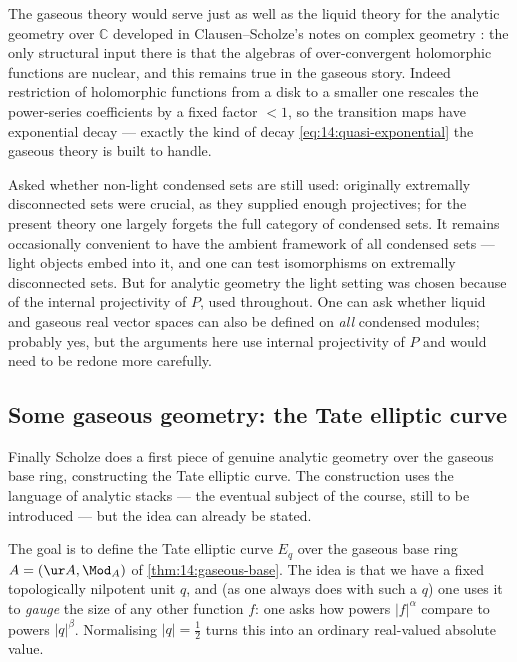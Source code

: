 \begin{remark}
\label{rmk:14:complex-geometry}
The gaseous theory would serve just as well as the liquid theory for the analytic
geometry over $\mathbb{C}$ developed in Clausen--Scholze's notes on complex geometry
\cite{clausen2020analytic}: the only structural input there is that the algebras of
over-convergent holomorphic functions are nuclear, and this remains true in the
gaseous story. Indeed restriction of holomorphic functions from a disk to a smaller
one rescales the power-series coefficients by a fixed factor $<1$, so the transition
maps have exponential decay --- exactly the kind of decay
\eqref{eq:14:quasi-exponential} the gaseous theory is built to handle.
\end{remark}

\begin{remark}
\label{rmk:14:light-vs-all}
Asked whether non-light condensed sets are still used: originally extremally
disconnected sets were crucial, as they supplied enough projectives; for the present
theory one largely forgets the full category of condensed sets. It remains
occasionally convenient to have the ambient framework of all condensed sets --- light
objects embed into it, and one can test isomorphisms on extremally disconnected sets.
But for analytic geometry the light setting was chosen because of the internal
projectivity of $P$, used throughout. One can ask whether liquid and gaseous real
vector spaces can also be defined on \emph{all} condensed modules; probably yes, but
the arguments here use internal projectivity of $P$ and would need to be redone more
carefully.
\end{remark}

\subsection{Some gaseous geometry: the Tate elliptic curve}

Finally Scholze does a first piece of genuine analytic geometry over the gaseous base
ring, constructing the Tate elliptic curve. The construction uses the language of
analytic stacks --- the eventual subject of the course, still to be introduced --- but
the idea can already be stated.

\begin{remark}
\label{rmk:14:tate-goal}
The goal is to define the Tate elliptic curve $E_q$ over the gaseous base ring
$A=(\ur A,\Mod_A)$ of \cref{thm:14:gaseous-base}. The idea is that we have a fixed
topologically nilpotent unit $q$, and (as one always does with such a $q$) one
uses it to \emph{gauge} the size of any other function $f$: one asks
how powers $|f|^{\alpha}$ compare to powers $|q|^{\beta}$. Normalising $|q|=\tfrac12$
turns this into an ordinary real-valued absolute value.
\end{remark}

